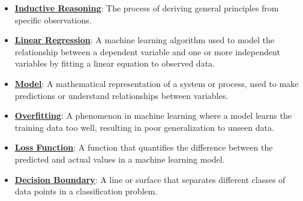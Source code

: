 \documentclass{article}%
\begin{document}
\begin{itemize}[leftmargin=*]%
\item \href{https://purdue.brightspace.com/d2l/common/assets/pdfjs-d2l-dist/1.0.14-legacy/web/viewer.html?file=%2Fcontent%2Fenforced%2F1095467-wl.202510.CS.24300.001%2F05L2-ML Basics.pdf%3Fou%3D1095467&lang=en-us&container=d2l-fileviewer-rendered-pdf&fullscreen=d2l-fileviewer-rendered-pdf-dialog&height=667#page=3}{\textbf{Inductive Reasoning}}: The process of deriving general principles from specific observations.%
\item \href{https://purdue.brightspace.com/d2l/common/assets/pdfjs-d2l-dist/1.0.14-legacy/web/viewer.html?file=%2Fcontent%2Fenforced%2F1095467-wl.202510.CS.24300.001%2F05L2-ML Basics.pdf%3Fou%3D1095467&lang=en-us&container=d2l-fileviewer-rendered-pdf&fullscreen=d2l-fileviewer-rendered-pdf-dialog&height=667#page=6}{\textbf{Linear Regression}}: A machine learning algorithm used to model the relationship between a dependent variable and one or more independent variables by fitting a linear equation to observed data.%
\item \href{https://purdue.brightspace.com/d2l/common/assets/pdfjs-d2l-dist/1.0.14-legacy/web/viewer.html?file=%2Fcontent%2Fenforced%2F1095467-wl.202510.CS.24300.001%2F05L2-ML Basics.pdf%3Fou%3D1095467&lang=en-us&container=d2l-fileviewer-rendered-pdf&fullscreen=d2l-fileviewer-rendered-pdf-dialog&height=667#page=5}{\textbf{Model}}: A mathematical representation of a system or process, used to make predictions or understand relationships between variables.%
\item \href{https://purdue.brightspace.com/d2l/common/assets/pdfjs-d2l-dist/1.0.14-legacy/web/viewer.html?file=%2Fcontent%2Fenforced%2F1095467-wl.202510.CS.24300.001%2F05L2-ML Basics.pdf%3Fou%3D1095467&lang=en-us&container=d2l-fileviewer-rendered-pdf&fullscreen=d2l-fileviewer-rendered-pdf-dialog&height=667#page=14}{\textbf{Overfitting}}: A phenomenon in machine learning where a model learns the training data too well, resulting in poor generalization to unseen data.%
\item \href{https://purdue.brightspace.com/d2l/common/assets/pdfjs-d2l-dist/1.0.14-legacy/web/viewer.html?file=%2Fcontent%2Fenforced%2F1095467-wl.202510.CS.24300.001%2F05L2-ML Basics.pdf%3Fou%3D1095467&lang=en-us&container=d2l-fileviewer-rendered-pdf&fullscreen=d2l-fileviewer-rendered-pdf-dialog&height=667#page=25}{\textbf{Loss Function}}: A function that quantifies the difference between the predicted and actual values in a machine learning model.%
\item \href{https://purdue.brightspace.com/d2l/common/assets/pdfjs-d2l-dist/1.0.14-legacy/web/viewer.html?file=%2Fcontent%2Fenforced%2F1095467-wl.202510.CS.24300.001%2F05L2-ML Basics.pdf%3Fou%3D1095467&lang=en-us&container=d2l-fileviewer-rendered-pdf&fullscreen=d2l-fileviewer-rendered-pdf-dialog&height=667#page=24}{\textbf{Decision Boundary}}: A line or surface that separates different classes of data points in a classification problem.%

\end{itemize}
\end{document}
